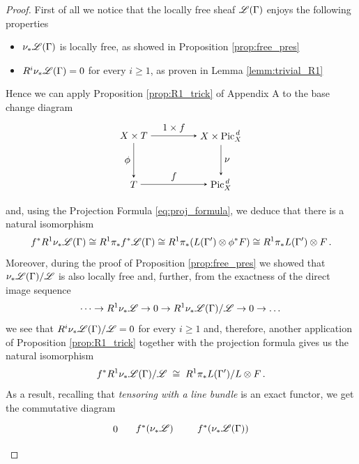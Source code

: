 	\begin{proof}
		First of all we notice that the locally free sheaf $\scL(\Gamma)$ enjoys the following properties 
		\begin{itemize}
			\item $\nu_{*} \scL(\Gamma)$ is locally free, as showed in Proposition \ref{prop:free_pres}
			\item $R^i \nu_{*} \scL(\Gamma) = 0$ for every $i\geq 1$, as proven in Lemma \ref{lemm:trivial_R1}
		\end{itemize}
		Hence we can apply Proposition \ref{prop:R1_trick} of Appendix A to the base change diagram
		$$
		\begin{tikzpicture}[node distance=5em, auto]
			\node (A) 															{$X\times T$};
			\node (B) 	[right of=A, xshift=4em]		{$X\times \Pd$};
		  \node (C) 	[below of=A]	 							{$T$};
		  \node (D) 	[below of=B] 								{$\Pd$};
		  \draw[-stealth] 				(A)		to node {$1\times f$} (B);
		  \draw[-stealth]					(C)		to node {$f$} 				(D);
		  \draw[-stealth][swap]		(A)		to node {$\phi$} 			(C);
		  \draw[-stealth]					(B)		to node {$\nu$} 			(D);
		\end{tikzpicture}
		$$
		and, using the Projection Formula \eqref{eq:proj_formula}, we deduce that there is a natural isomorphism
		\begin{equation}
			f^* R^1 \nu_{*} \mathscr{L}(\Gamma) \cong  R^1 \pi_* f^* \mathscr{L}(\Gamma) \cong R^1 \pi_* (L(\Gamma')\otimes \phi^*F ) \cong R^1 \pi_* L(\Gamma') \otimes F \,.
		\end{equation}
		Moreover, during the proof of Proposition \ref{prop:free_pres} we showed that $\nu_{*} \scL(\Gamma)/\scL $ is also locally free and, further, from the exactness of the direct image sequence
		$$ 
			\dots \to R^1 \nu_{*} \scL \to 0 \to R^1 \nu_{*} \scL(\Gamma)/\scL \to 0 \to \dots
		$$
		we see that $R^i \nu_{*} \scL(\Gamma)/\scL = 0$ for every $i\geq 1$ and, therefore, another application of Proposition \ref{prop:R1_trick} together with the projection formula gives us the natural isomorphism
		$$
			f^* R^1 \nu_{*} \scL(\Gamma)/\scL \; \cong \;  R^1 \pi_* L(\Gamma')/L \otimes F \,.
		$$
		As a result, recalling that \emph{tensoring with a line bundle} is an exact functor, we get the commutative diagram
		$$
		\begin{tikzpicture}[node distance=8em, auto]
			\node (O) 																{$0$};
			\node (A) 	[right of=O, xshift=-4em]			{$f^* (\nu_{*}\scL)$};
			\node (B) 	[right of=A, xshift=-1em]			{$f^* (\nu_{*} \scL(\Gamma))$};

\end{tikzpicture}$$
\end{proof}
